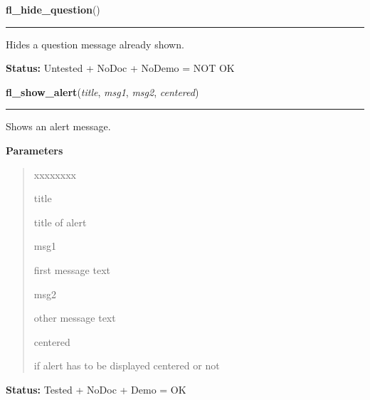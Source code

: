\hspace{.8\funcindent}\begin{boxedminipage}{\funcwidth}

    \raggedright \textbf{fl\_hide\_question}()

    \vspace{-1.5ex}

    \rule{\textwidth}{0.5\fboxrule}
\setlength{\parskip}{2ex}
    Hides a question message already shown.

\setlength{\parskip}{1ex}
\textbf{Status:} Untested + NoDoc + NoDemo = NOT OK



    \end{boxedminipage}

    \label{xformslib:flgoodies:fl_show_alert}

    \vspace{0.5ex}

\hspace{.8\funcindent}\begin{boxedminipage}{\funcwidth}

    \raggedright \textbf{fl\_show\_alert}(\textit{title}, \textit{msg1}, \textit{msg2}, \textit{centered})

    \vspace{-1.5ex}

    \rule{\textwidth}{0.5\fboxrule}
\setlength{\parskip}{2ex}
    Shows an alert message.

\setlength{\parskip}{1ex}
      \textbf{Parameters}
      \vspace{-1ex}

      \begin{quote}
        \begin{Ventry}{xxxxxxxx}

          \item[title]

          title of alert

          \item[msg1]

          first message text

          \item[msg2]

          other message text

          \item[centered]

          if alert has to be displayed centered or not

        \end{Ventry}

      \end{quote}

\textbf{Status:} Tested + NoDoc + Demo = OK



    \end{boxedminipage}

